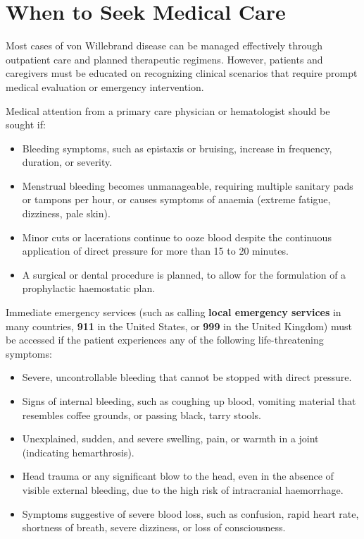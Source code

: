\section*{When to Seek Medical Care}
Most cases of von Willebrand disease can be managed effectively through outpatient care and planned therapeutic regimens. However, patients and caregivers must be educated on recognizing clinical scenarios that require prompt medical evaluation or emergency intervention.

Medical attention from a primary care physician or hematologist should be sought if:
\begin{itemize}
    \item Bleeding symptoms, such as epistaxis or bruising, increase in frequency, duration, or severity.
    \item Menstrual bleeding becomes unmanageable, requiring multiple sanitary pads or tampons per hour, or causes symptoms of anaemia (extreme fatigue, dizziness, pale skin).
    \item Minor cuts or lacerations continue to ooze blood despite the continuous application of direct pressure for more than 15 to 20 minutes.
    \item A surgical or dental procedure is planned, to allow for the formulation of a prophylactic haemostatic plan.
\end{itemize}

Immediate emergency services (such as calling \textbf{local emergency services} in many countries, \textbf{911} in the United States, or \textbf{999} in the United Kingdom) must be accessed if the patient experiences any of the following life-threatening symptoms:
\begin{itemize}
    \item Severe, uncontrollable bleeding that cannot be stopped with direct pressure.
    \item Signs of internal bleeding, such as coughing up blood, vomiting material that resembles coffee grounds, or passing black, tarry stools.
    \item Unexplained, sudden, and severe swelling, pain, or warmth in a joint (indicating hemarthrosis).
    \item Head trauma or any significant blow to the head, even in the absence of visible external bleeding, due to the high risk of intracranial haemorrhage.
    \item Symptoms suggestive of severe blood loss, such as confusion, rapid heart rate, shortness of breath, severe dizziness, or loss of consciousness.
\end{itemize}

